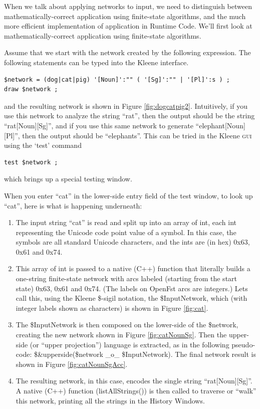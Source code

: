 \documentclass[letterpaper,12pt]{article}
\providecommand{\acro}{}\renewcommand{\acro}{\textsc}
\begin{document}
When we talk about applying networks to input, we need to distinguish between 
mathematically-correct application using finite-state algorithms, and the much more efficient
implementation of application in Runtime Code.  We'll first look at mathematically-correct
application using finite-state algorithms.


Assume that we start with the network created by the following expression.  The following statements
can be typed into the Kleene interface.

\begin{Verbatim}[fontsize=\small]
$network = (dog|cat|pig) '[Noun]':"" ( '[Sg]':"" | '[Pl]':s ) ;
draw $network ;
\end{Verbatim}

\noindent
and the resulting network is shown in Figure \ref{fig:dogcatpig2}.
Intuitively, if you use this network to analyze the string ``rat'', then
the output should be the string ``rat[Noun][Sg]'',
and if you use this same network to generate ``elephant[Noun][Pl]'', then the output should be
``elephants''.  This can be tried in the Kleene \acro{gui} using the `test' command

\begin{Verbatim}[fontsize=\small]
test $network ;
\end{Verbatim}

\noindent
which brings up a special testing window.

When you enter ``cat'' in the lower-side entry field of the test window, to look up ``cat'', here is what is happening
underneath:

\begin{enumerate}
\item
The input string ``cat'' is read and split up into an array of int, each int representing the Unicode code
point value of a symbol.  In this case, the symbols are all standard Unicode characters, and the
ints are (in hex) 0x63, 0x61 and 0x74.
\item
This array of int is passed to a native (C++) function that literally builds a one-string finite-state network with arcs
labeled (starting from the start state) 0x63, 0x61 and 0x74.  (The labels on OpenFst arcs are integers.)
Lets call this, using the Kleene \$-sigil notation, the \$InputNetwork, which (with integer
labels
shown as characters) is shown in Figure \ref{fig:cat}.
\item
The \$InputNetwork is then composed on the lower-side of the \$network, creating the new network
shown in Figure \ref{fig:catNounSg}.  Then the upper-side (or ``upper projection'') language is
extracted, as in the following pseudo-code: \$\&upperside(\$network \_o\_ \$InputNetwork).  The
final network result is shown in Figure \ref{fig:catNounSgAcc}.
\item
The resulting network, in this case, encodes the single string ``rat[Noun][Sg]''.  A native (C++)
function (listAllStrings()) is then called to traverse or ``walk'' this network, printing all the strings in the
History Windows.
\end{enumerate}
\end{document}
